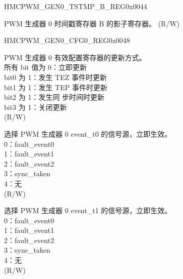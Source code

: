 \begin{register}{H}{MCPWM\_GEN0\_TSTMP\_B\_REG}{0x0044}\label{regdesc:MCPWMGEN0TSTMPBREG}
%
%
\regnewline%
\begin{regdesc}\begin{reglist}
\label{fielddesc:MCPWMGEN0B}\item [MCPWM\_GEN0\_B] PWM 生成器 0 时间戳寄存器 B 的影子寄存器。 (R/W)
\end{reglist}\end{regdesc}
\end{register}


\begin{register}{H}{MCPWM\_GEN0\_CFG0\_REG}{0x0048}\label{regdesc:MCPWMGEN0CFG0REG}
%
%
%
%
\regnewline%
\begin{regdesc}\begin{reglist}
\label{fielddesc:MCPWMGEN0CFGUPMETHOD}\item [MCPWM\_GEN0\_CFG\_UPMETHOD] PWM 生成器 0 有效配置寄存器的更新方式。\\所有 bit 值为 0：立即更新\\bit0 为 1：发生 TEZ 事件时更新\\bit1 为 1：发生 TEP 事件时更新\\bit2 为 1：发生同 步时间时更新\\bit3 为 1：关闭更新\\ (R/W)
\label{fielddesc:MCPWMGEN0T0SEL}\item [MCPWM\_GEN0\_T0\_SEL] 选择 PWM 生成器 0 event\_t0 的信号源，立即生效。\\0：fault\_event0\\1：fault\_event1\\2：fault\_event2\\3：sync\_taken\\4：无\\(R/W)
\label{fielddesc:MCPWMGEN0T1SEL}\item [MCPWM\_GEN0\_T1\_SEL] 选择 PWM 生成器 0 event\_t1 的信号源，立即生效。\\0：fault\_event0\\1：fault\_event1\\2：fault\_event2\\3：sync\_taken\\4：无\\ (R/W)
\end{reglist}\end{regdesc}
\end{register}


